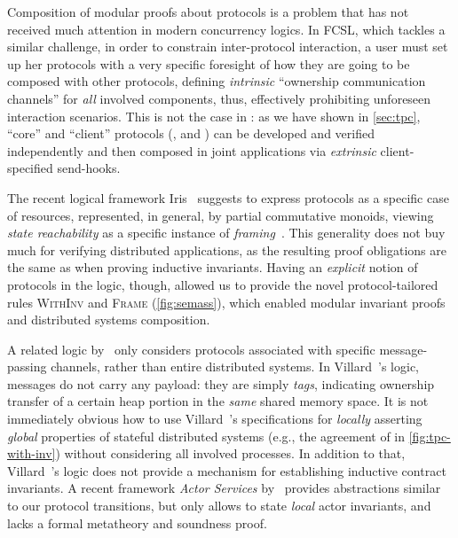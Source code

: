 Composition of modular proofs about protocols is a problem that has
not received much attention in modern concurrency logics. In FCSL,
which tackles a similar challenge, in order to constrain
inter-protocol interaction, a user must set up her protocols with a
very specific foresight of how they are going to be composed with
other protocols, defining \emph{intrinsic} ``ownership communication
channels'' for \emph{all} involved components, thus, effectively
prohibiting unforeseen interaction scenarios. This is not the case in
\disel: as we have shown in \cref{sec:tpc}, ``core'' and
``client'' protocols (\eg,  and ) can be
developed and verified independently and then composed in joint
applications via \emph{extrinsic} client-specified send-hooks.

The recent logical framework Iris~\cite{Jung-al:POPL15,Jung-al:ICFP16}
suggests to express protocols as a specific case of resources,
represented, in general, by partial commutative monoids, viewing
\emph{state reachability} as a specific instance of
\emph{framing}~\cite{Reynolds:LICS02}. This generality does not buy
much for verifying distributed applications, as the resulting proof
obligations are the same as when proving inductive invariants.  Having
an \emph{explicit} notion of protocols in the logic, though, allowed
us to provide the novel protocol-tailored rules \textsc{WithInv} and
\textsc{Frame} (\cf \cref{fig:semass}), which enabled modular
invariant proofs and distributed systems composition.

A related logic by~\citet{Villard-al:APLAS09} only considers protocols
associated with specific message-passing channels, rather than entire
distributed systems.
%
%
In Villard~\etal's logic, messages do not carry any payload: they are
simply \emph{tags}, indicating ownership transfer of a certain heap
portion in the \emph{same} shared memory space. It is not immediately
obvious how to use Villard~\etal's specifications for \emph{locally}
asserting \emph{global} properties of stateful distributed systems
(e.g., the agreement of  in \cref{fig:tpc-with-inv})
without considering all involved processes.
%
In addition to that, Villard~\etal's logic does not provide a
mechanism for establishing inductive contract invariants.
%
A recent framework \emph{Actor Services}
by~\citet{Summers-Muller:ESOP16} provides abstractions similar to our
protocol transitions, but only allows to state \emph{local} actor
invariants, and lacks a formal metatheory and soundness proof.
%

